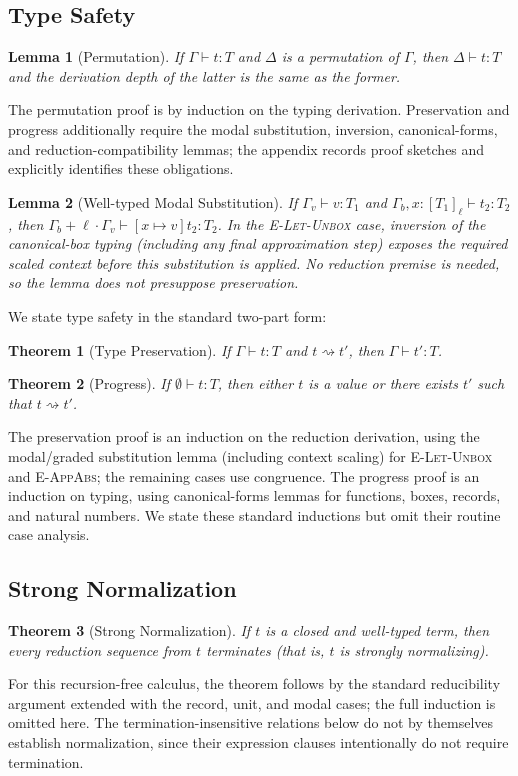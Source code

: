 \documentclass[conference]{IEEEtran}
\newcommand\reduce{\rightsquigarrow}
\newtheorem{theorem}{Theorem}
\newtheorem{lemma}{Lemma}
\begin{document}
\subsection{Type Safety}
\label{lem-perm}
\begin{lemma}[Permutation]
	If $\Gamma\vdash t:T$ and $\Delta$ is a permutation of $\Gamma$, then $\Delta\vdash t:T$ and the derivation depth of the latter is the same as the former.
\end{lemma}
The permutation proof is by induction on the typing derivation. Preservation and progress additionally require the modal substitution, inversion, canonical-forms, and reduction-compatibility lemmas; the appendix records proof sketches and explicitly identifies these obligations.
\begin{lemma}[Well-typed Modal Substitution]
	If $\Gamma_v\vdash v:T_1$ and $\Gamma_b,x:[T_1]_\ell\vdash t_2:T_2$, then $\Gamma_b+\ell\cdot\Gamma_v\vdash[x\mapsto v]t_2:T_2$. In the \textsc{E-Let-Unbox} case, inversion of the canonical-box typing (including any final approximation step) exposes the required scaled context before this substitution is applied. No reduction premise is needed, so the lemma does not presuppose preservation.
\end{lemma}
We state type safety in the standard two-part form:
\begin{theorem}[Type Preservation]\label{thm-preservation}
	If $\Gamma\vdash t:T$ and $t\reduce t'$, then $\Gamma\vdash t':T$.
\end{theorem}
\begin{theorem}[Progress]\label{thm-progress}
	If $\emptyset\vdash t:T$, then either $t$ is a value or there exists $t'$ such that $t\reduce t'$.
\end{theorem}
The preservation proof is an induction on the reduction derivation, using the modal/graded substitution lemma (including context scaling) for \textsc{E-Let-Unbox} and \textsc{E-AppAbs}; the remaining cases use congruence. The progress proof is an induction on typing, using canonical-forms lemmas for functions, boxes, records, and natural numbers. We state these standard inductions but omit their routine case analysis.

\subsection{Strong Normalization}
\label{thm-sn}
\begin{theorem}[Strong Normalization]
	If $t$ is a closed and well-typed  term, then every reduction sequence from $t$ terminates (that is, $t$ is strongly normalizing).
\end{theorem}
For this recursion-free calculus, the theorem follows by the standard reducibility argument extended with the record, unit, and modal cases; the full induction is omitted here. The termination-insensitive relations below do not by themselves establish normalization, since their expression clauses intentionally do not require termination.
\end{document}
